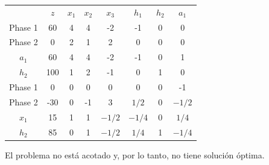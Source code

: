 \begin{enumerate}
    \begin{center}
    \begin{tabular}{c|c|cccccc|}
     & $z$ & $x_1$ & $x_2$ & $x_3$ & $h_1$ & $h_2$ & $a_1$\\ 
    Phase 1 & 60 & 4 & 4 & -2 & -1 & 0 & 0 \\ 
    Phase 2 & 0 & 2 & 1 & 2 & 0 & 0 & 0 \\ 
    \hline
    $a_1$ & 60  & 4 & 4 & -2 & -1 & 0 & 1\\ 
    $h_2$ & 100  & 1 & 2 & -1 & 0 & 1 & 0\\ 
    \hline
    Phase 1 & 0 & 0 & 0 & 0 & 0 & 0 & -1 \\ 
    Phase 2 & -30 & 0 & -1 & 3 & $1/2$ & 0 & $-1/2$ \\ 
    \hline
    $x_1$ & 15  & 1 & 1 & $-1/2$ & $-1/4$ & 0 & $1/4$\\ 
    $h_2$ & 85  & 0 & 1 & $-1/2$ & $1/4$ & 1 & $-1/4$\\ 
    \hline
    \end{tabular}
    \end{center}

    El problema no está acotado y, por lo tanto, no tiene solución óptima. 

    
    \end{enumerate}





